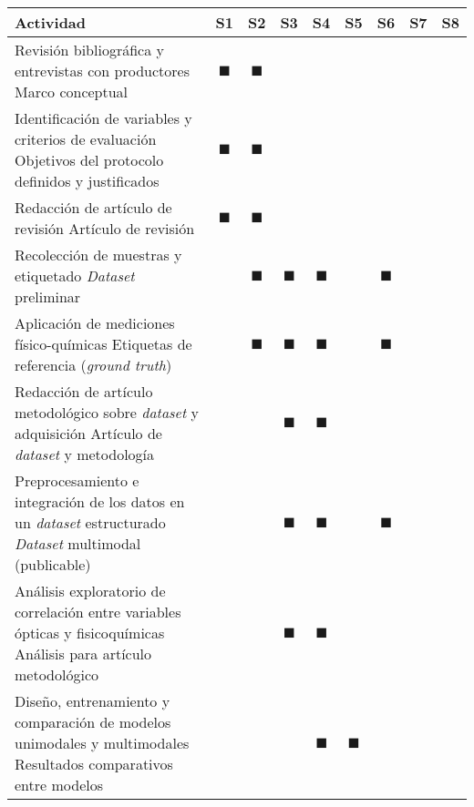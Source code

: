 \begin{landscape}
\begin{table}[h]
\centering
\scriptsize
\begin{tabular}{|p{10cm}|c|c|c|c|c|c|c|c|}
\hline
\textbf{Actividad} & \textbf{S1} & \textbf{S2} & \textbf{S3} & \textbf{S4} & \textbf{S5} & \textbf{S6} & \textbf{S7} & \textbf{S8} \\
\hline
Revisión bibliográfica y entrevistas con productores \newline [OE1] Marco conceptual & $\blacksquare$ & $\blacksquare$ &  &  &  &  &  &  \\
\hline
Identificación de variables y criterios de evaluación \newline [OE1] Objetivos del protocolo definidos y justificados & $\blacksquare$ & $\blacksquare$ &  &  &  &  &  &  \\
\hline
Redacción de artículo de revisión \newline [OE1] Artículo de revisión & $\blacksquare$ & $\blacksquare$ &  &  &  &  &  &  \\
\hline
Recolección de muestras y etiquetado \newline [OE2] \textit{Dataset} preliminar &  & $\blacksquare$ & $\blacksquare$ & $\blacksquare$ &  & $\blacksquare$ &  &  \\
\hline
Aplicación de mediciones físico-químicas \newline [OE2] Etiquetas de referencia (\textit{ground truth}) &  & $\blacksquare$ & $\blacksquare$ & $\blacksquare$ &  & $\blacksquare$ &  &  \\
\hline
Redacción de artículo metodológico sobre \textit{dataset} y adquisición \newline [OE2, OE3] Artículo de \textit{dataset} y metodología &  &  & $\blacksquare$ & $\blacksquare$ &  &  &  &  \\
\hline
Preprocesamiento e integración de los datos en un \textit{dataset} estructurado \newline [OE2, OE3] \textit{Dataset} multimodal (publicable) &  &  & $\blacksquare$ & $\blacksquare$ &  & $\blacksquare$ &  &  \\
\hline
Análisis exploratorio de correlación entre variables ópticas y fisicoquímicas \newline [OE2] Análisis para artículo metodológico &  &  & $\blacksquare$ & $\blacksquare$ &  &  &  &  \\
\hline
Diseño, entrenamiento y comparación de modelos unimodales y multimodales \newline [OE3, OE4] Resultados comparativos entre modelos &  &  &  & $\blacksquare$ & $\blacksquare$ &  &  &  \\

\end{tabular}
\end{table}
\end{landscape}
